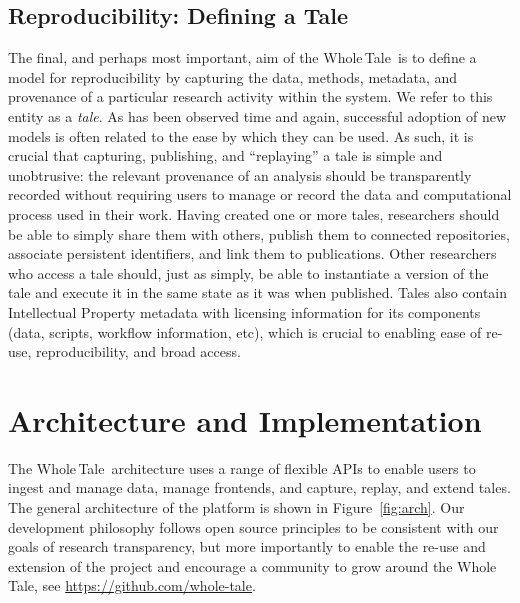 \documentclass{elsarticle}
\newcommand{\wt}{Whole\,Tale}
\begin{document}
\subsection{Reproducibility: Defining a Tale}

The final, and perhaps most important, aim of the \wt\ is to 
define a model for reproducibility by capturing the data, methods, metadata, and provenance of a particular research activity within the system. We refer to this entity as
a \emph{tale}. As has been observed time and again, successful adoption of 
new models is often related to the ease by which they can be used. As such, 
it is crucial that capturing, publishing, and ``replaying'' a tale is simple and unobtrusive: the relevant
provenance of an analysis should be transparently recorded 
without requiring users to manage or record the data and computational
process used in their work.
Having created one or more tales, researchers should be able to simply share
them with others, publish them to connected repositories, associate
persistent identifiers, and link them to publications. Other researchers
who access a tale should, just as simply, be able to instantiate a version
of the tale and execute it in the same state as it was when published. Tales also contain Intellectual Property metadata with licensing information for its components (data, scripts, workflow information, etc), which is crucial to enabling ease of re-use, reproducibility, and broad access.



\section{Architecture and Implementation}\label{sec:architecture}

The \wt\ architecture uses a range of flexible APIs to enable users to ingest and manage data, 
manage frontends, and capture, replay, and extend tales.  The general architecture
of the platform is shown in Figure~\ref{fig:arch}. Our development philosophy follows open source principles to be consistent with our goals of research transparency, but more importantly to enable the re-use and extension of the project and encourage a community to grow around the \wt, see \url{https://github.com/whole-tale}.
\end{document}
